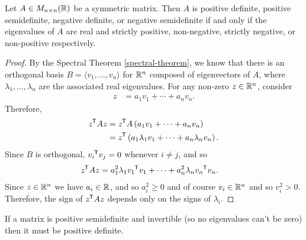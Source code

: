 \begin{thm}\label{positive-semidefinite-criteria}
    Let $A \in M_{n \times n}(\mathbb{R})$ be a symmetric matrix. Then $A$ is positive definite, positive semidefinite, negative definite, or negative semidefinite if and only if the eigenvalues of $A$ are real and strictly positive, non-negative, strictly negative, or non-positive respectively.
\end{thm}

\begin{proof}
    By the Spectral Theorem \ref{spectral-theorem}, we know that there is an orthogonal basis $B = \langle v_1, \ldots, v_n\rangle$ for $\mathbb{R}^n$ composed of eigenvectors of $A$, where $\lambda_1, \ldots, \lambda_n$ are the associated real eigenvalues. For any non-zero $z \in \mathbb{R}^n$, consider
    \begin{align*}
        z &= a_1v_1 + \cdots + a_nv_n.
    \end{align*}
    Therefore,
    \begin{align*}
        {z}^{\mkern-1.5mu\mathsf{T}}Az &= {z}^{\mkern-1.5mu\mathsf{T}}A\left(a_1v_1 + \cdots + a_nv_n\right) \\
        &= {z}^{\mkern-1.5mu\mathsf{T}}\left(a_1\lambda_1v_1 + \cdots + a_n\lambda_{n}v_n\right).
    \end{align*}
    Since $B$ is orthogonal, ${v_i}^{\mkern-1.5mu\mathsf{T}}v_j = 0$ whenever $i \neq j$, and so
    \begin{align*}
        {z}^{\mkern-1.5mu\mathsf{T}}Az &= a_1^2\lambda_1{v_1}^{\mkern-1.5mu\mathsf{T}}v_1 + \cdots + a_n^2\lambda_{n}{v_n}^{\mkern-1.5mu\mathsf{T}}v_n.
    \end{align*}
    Since $z \in \mathbb{R}^n$ we have $a_i \in \mathbb{R}$, and so $a_i^2 \geq 0$ and of course $v_i \in \mathbb{R}^n$ and so $v_i^2 > 0$. Therefore, the sign of ${z}^{\mkern-1.5mu\mathsf{T}}Az$ depends only on the signs of $\lambda_i$.
\end{proof}

\begin{cor}
    If a matrix is positive semidefinite and invertible (so no eigenvalues can't be zero) then it must be positive definite.
\end{cor}
